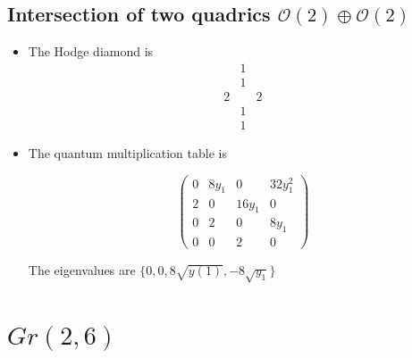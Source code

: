 \documentclass[11pt]{amsart}
\begin{document}
\subsection{Intersection of two quadrics $\mathcal{O}(2) \oplus \mathcal{O}(2)$}

\begin{itemize}
\item[1)] The Hodge diamond is
\[
    \begin{array}{ccc}
         &1  \\
         &1\\
         2&&2\\
         &1\\
         &1
    \end{array}
\]


\item[2)] The quantum multiplication table is

\[
\begin{pmatrix}
0 & 8y_1 & 0 & 32y_1^2 \\
2 & 0 & 16y_1 & 0 \\
0 & 2 & 0 & 8y_1 \\
0 & 0 & 2 & 0
\end{pmatrix}
\]

The eigenvalues are $\{0,0,8\sqrt{y(1)},-8\sqrt{y_1}\}$


\end{itemize}

\section{$Gr(2,6)$}
\end{document}
